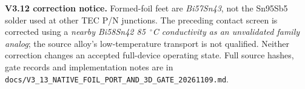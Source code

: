 \textbf{V3.12 correction notice.} Formed-foil feet are \emph{Bi57Sn43}, not the Sn95Sb5 solder used at other TEC P/N junctions. The preceding contact screen is corrected using a \emph{nearby Bi58Sn42 85~$^\circ$C conductivity as an unvalidated family analog}; the source alloy's low-temperature transport is not qualified. Neither correction changes an accepted full-device operating state. Full source hashes, gate records and implementation notes are in \texttt{docs/V3\_13\_NATIVE\_FOIL\_PORT\_AND\_3D\_GATE\_20261109.md}.
